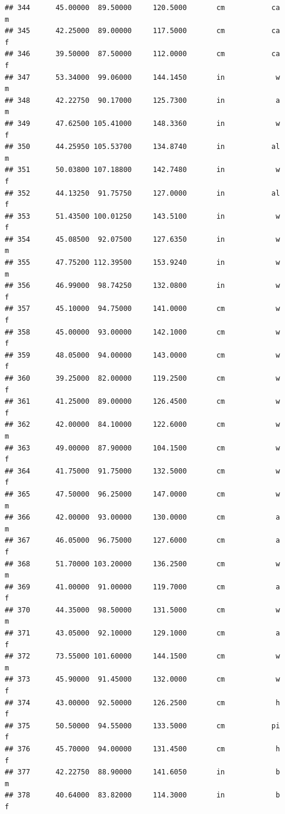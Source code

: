 \documentclass[]{article}
\begin{document}
\begin{verbatim}
## 344      45.00000  89.50000     120.5000       cm           ca         m
## 345      42.25000  89.00000     117.5000       cm           ca         f
## 346      39.50000  87.50000     112.0000       cm           ca         f
## 347      53.34000  99.06000     144.1450       in            w         m
## 348      42.22750  90.17000     125.7300       in            a         m
## 349      47.62500 105.41000     148.3360       in            w         f
## 350      44.25950 105.53700     134.8740       in           al         m
## 351      50.03800 107.18800     142.7480       in            w         f
## 352      44.13250  91.75750     127.0000       in           al         f
## 353      51.43500 100.01250     143.5100       in            w         f
## 354      45.08500  92.07500     127.6350       in            w         m
## 355      47.75200 112.39500     153.9240       in            w         m
## 356      46.99000  98.74250     132.0800       in            w         f
## 357      45.10000  94.75000     141.0000       cm            w         f
## 358      45.00000  93.00000     142.1000       cm            w         f
## 359      48.05000  94.00000     143.0000       cm            w         f
## 360      39.25000  82.00000     119.2500       cm            w         f
## 361      41.25000  89.00000     126.4500       cm            w         f
## 362      42.00000  84.10000     122.6000       cm            w         m
## 363      49.00000  87.90000     104.1500       cm            w         f
## 364      41.75000  91.75000     132.5000       cm            w         f
## 365      47.50000  96.25000     147.0000       cm            w         m
## 366      42.00000  93.00000     130.0000       cm            a         m
## 367      46.05000  96.75000     127.6000       cm            a         f
## 368      51.70000 103.20000     136.2500       cm            w         m
## 369      41.00000  91.00000     119.7000       cm            a         f
## 370      44.35000  98.50000     131.5000       cm            w         m
## 371      43.05000  92.10000     129.1000       cm            a         f
## 372      73.55000 101.60000     144.1500       cm            w         m
## 373      45.90000  91.45000     132.0000       cm            w         f
## 374      43.00000  92.50000     126.2500       cm            h         f
## 375      50.50000  94.55000     133.5000       cm           pi         f
## 376      45.70000  94.00000     131.4500       cm            h         f
## 377      42.22750  88.90000     141.6050       in            b         m
## 378      40.64000  83.82000     114.3000       in            b         f

\end{verbatim}
\end{document}
